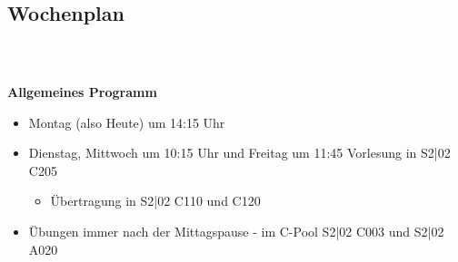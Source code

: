 \subsection{Wochenplan}
\begin{frame}
	\frametitle{\insertsectionhead \\ {\small \insertsubsectionhead}}
	\textbf{Allgemeines Programm}
	\begin{itemize}
		\item Montag (also Heute) um 14:15 Uhr
		\item Dienstag, Mittwoch um 10:15 Uhr und Freitag um 11:45 Vorlesung in S2|02 C205
		\begin{itemize}
			\item Übertragung in S2|02 C110 und C120
		\end{itemize}
		\item Übungen immer nach der Mittagspause - im C-Pool S2|02 C003 und S2|02 A020
	\end{itemize}
\end{frame}


